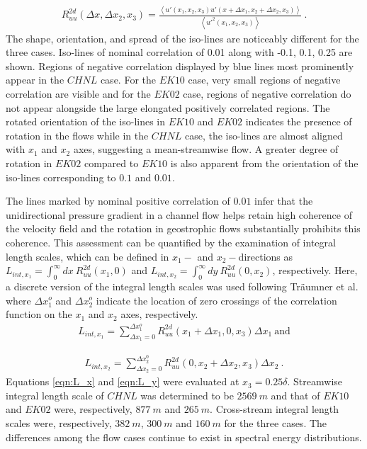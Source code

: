 \begin{align}
 R_{uu}^{2d}(\Delta x, \Delta x_2, x_3)=\frac{\left < u'(x_1, x_2, x_3)u'(x+ \Delta x_1, x_2 + \Delta x_2, x_3) \right >}{\left < u'^{2}(x_1,x_2,x_3)\right >} \ .
 \label{eqn:2d_corr}
\end{align}
The shape, orientation, and spread of the iso-lines are noticeably different for the three cases. Iso-lines of nominal correlation of 0.01 along with -0.1, 0.1, 0.25 are shown. Regions of negative correlation displayed by blue lines most prominently appear in  the $CHNL$ case. For the $EK10$ case, very small regions of negative correlation are visible and for the $EK02$ case, regions of negative correlation do not appear alongside the large elongated positively correlated regions. The rotated orientation of the iso-lines in $EK10$ and $EK02$ indicates  the presence of rotation in the flows while in the $CHNL$ case, the iso-lines are almost aligned with $x_1$ and $x_2$ axes, suggesting  a mean-streamwise flow. A greater degree of rotation in $EK02$ compared to $EK10$ is also apparent from the orientation of the iso-lines corresponding to $0.1$ and $0.01$.  

The lines marked by nominal positive correlation of $0.01$ infer that the unidirectional pressure gradient in a channel flow helps retain high coherence of the velocity field and the rotation in geostrophic flows substantially prohibits this coherence. This assessment can be quantified by the examination of integral length scales, which can be defined in $x_1-$ and $x_2-$directions as $L_{int,x_1}=\int_0^{\infty} dx\ R_{uu}^{2d}(x_1,0)$ and $L_{int,x_2}=\int_0^{\infty} dy\ R_{uu}^{2d}(0,x_2)$, respectively. Here, a discrete version of the integral length scales was used following Tr{\"a}umner et al. \cite{traumner_blm_2015} where $\Delta x_1^{o}$ and $\Delta x_2^{o}$ indicate the location of zero crossings of the correlation function on the $x_1$ and $x_2$ axes, respectively. 
\begin{align}
L_{int,x_1}=\sum_{\Delta x_1=0}^{\Delta x_1^{o}}R_{uu}^{2d}(x_1+\Delta x_1, 0,x_3)\Delta x_1 \ \text{and}
\label{eqn:L_x}
\end{align}

\begin{align}
L_{int,x_2}=\sum_{\Delta x_2 = 0}^{\Delta x_2^{0}}R_{uu}^{2d}(0, x_2+\Delta x_2,x_3)\Delta x_2\ .
\label{eqn:L_y}
\end{align}
Equations \ref{eqn:L_x} and \ref{eqn:L_y} were evaluated at $x_3=0.25\delta$. Streamwise integral length scale of $CHNL$ was determined  to be $2569\ m$ and that of $EK10$ and $EK02$ were, respectively, $877\ m$ and $265\ m$. Cross-stream integral length scales were, respectively, $382\ m$, $300\ m$ and $160\ m$ for the three cases. The differences among the flow cases continue to exist in spectral energy distributions.  

